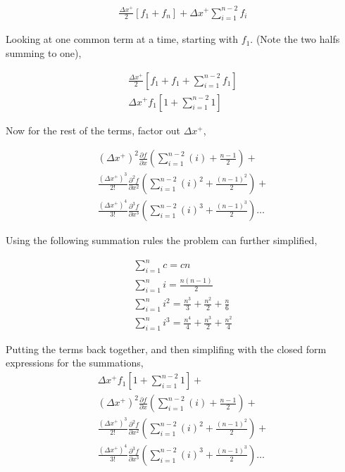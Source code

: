 \documentclass[12pt]{article}
\begin{document}
\begin{align*}
    \frac{\Delta x^+ }{2}\left[ f_1 + f_n \right] + \Delta x^+ \sum_{i=1}^{n-2} f_i 
\end{align*}

Looking at one common term at a time, starting with $f_1$. (Note the two halfs
summing to one),

\begin{align*} \frac{\Delta x^+}{2}\left[ f_1 + f_1 + \sum_{i=1}^{n-2} f_1 \right] \\
    \Delta x^+ f_1\left[ 1 + \sum_{i=1}^{n-2}1 \right]
\end{align*}

Now for the rest of the terms, factor out $\Delta x^+$,

\begin{align*}
    (\Delta x^+)^2 \frac{\partial f}{\partial x } \left(
        \sum_{i = 1}^{n - 2} \left( i\right) + \frac{n-1}{2} \right) + \\
        \frac{(\Delta x^+)^3}{2!} \frac{\partial^2 f}{\partial x^2 } \left(
    \sum_{i = 1}^{n - 2} \left( i\right)^2 + \frac{(n-1)^2}{2} \right)  + \\
    \frac{(\Delta x^+)^4}{3!} \frac{\partial^3 f}{\partial x^3 } \left(
    \sum_{i = 1}^{n - 2} \left( i\right)^3 + \frac{(n-1)^3}{2} \right) \dots
\end{align*}

Using the following summation rules the problem can further simplified,

\begin{align*}
    \sum_{i = 1}^{n}c= cn  \\
    \sum_{i = 1}^{n}i =  \frac{n\left( n-1\right)}{2}  \\
    \sum_{i = 1}^{n}i^2  = \frac{n^3}{3} + \frac{n^2}{2} + \frac{n}{6}   \\
    \sum_{i = 1}^{n}i^3  = \frac{n^4}{4} + \frac{n^3}{2} + \frac{n^2}{4}  
\end{align*}

Putting the terms back together, and then simplifing with the closed form 
expressions for the summations,
\begin{align*}
    \Delta x^+ f_1\left[ 1 + \sum_{i=1}^{n-2}1 \right] + \\
    (\Delta x^+)^2 \frac{\partial f}{\partial x } \left(
        \sum_{i = 1}^{n - 2} \left( i\right) + \frac{n-1}{2} \right) + \\
        \frac{(\Delta x^+)^3}{2!} \frac{\partial^2 f}{\partial x^2 } \left(
    \sum_{i = 1}^{n - 2} \left( i\right)^2 + \frac{(n-1)^2}{2} \right)  + \\
    \frac{(\Delta x^+)^4}{3!} \frac{\partial^3 f}{\partial x^3 } \left(
    \sum_{i = 1}^{n - 2} \left( i\right)^3 + \frac{(n-1)^3}{2} \right) \dots
\end{align*}
\end{document}
